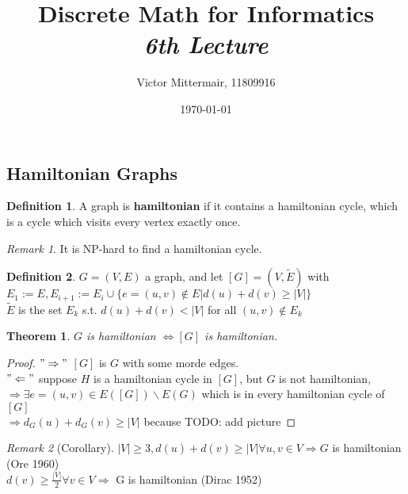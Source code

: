\documentclass{article}
\author{Victor Mittermair, 11809916}
\title{Discrete Math for Informatics\\
        \Large \emph{6th Lecture}}
\date{\today} %
\newtheorem*{theorem}{Theorem}
\theoremstyle{definition}
\newtheorem*{definition}{Definition}
\theoremstyle{remark}
\newtheorem*{remark}{Remark}
\begin{document}
\maketitle
\thispagestyle{firstpage}

\begin{comment}
\section*{Graph}
\begin{tikzpicture}[node distance={30mm}, thick, main/.style = {draw, circle}]
    \centering
    \node[main] (1)              {}; 
    \node[main] (2) [right of=1] {};
    \node[main] (3) [below of=1] {}; 
    \node[main] (4) [right of=3] {};
    \draw (1) -- (2) ; 
    \draw (1) -- (3); 
    \draw (2) -- (4); 
    \draw (3) -- (4);
    \draw (3) -- (2) node [midway, fill=white] {$e$}; 
\end{tikzpicture}
\end{comment}
\subsection*{Hamiltonian Graphs}
\begin{definition}
  A graph is \textbf{hamiltonian} if it contains a hamiltonian cycle, which is a cycle which visits every vertex exactly once.
\end{definition}
\begin{remark}
  It is NP-hard to find a hamiltonian cycle.
\end{remark}
\begin{definition}
  $G=(V,E)$ a graph, and let $[G]=(V,\widetilde{E})$ with $E_1:=E, E_{i+1}:=E_i\cup \{e=(u,v) \notin E | d(u) + d(v) \geq |V|\}$\\
  $\widetilde{E}$ is the set $E_k$ s.t. $d(u) + d(v) < |V|$ for all $(u,v) \notin E_k$
\end{definition}
\begin{theorem}
  $G$ is hamiltonian $\Leftrightarrow [G]$ is hamiltonian.
\end{theorem}
\begin{proof}
  $"\Rightarrow"$ $[G]$ is $G$ with some morde edges.\\
  $"\Leftarrow"$ suppose $H$ is a hamiltonian cycle in $[G]$, but $G$ is not hamiltonian,\\ $\Rightarrow \exists e=(u,v) \in E([G]) \backslash E(G)$ which is in every hamiltonian cycle of $[G]$ \\
  $\Rightarrow d_G(u)+d_G(v) \geq |V|$ because
  TODO: add picture
\end{proof}
\begin{remark}[Corollary]
  $|V| \geq 3, d(u)+d(v) \geq |V| \forall u,v \in V \Rightarrow G$ is hamiltonian (Ore 1960)\\
  $d(v) \geq \frac{|V|}{2} \forall v \in V \Rightarrow$ G is hamiltonian (Dirac 1952)
\end{remark}
\end{document}
